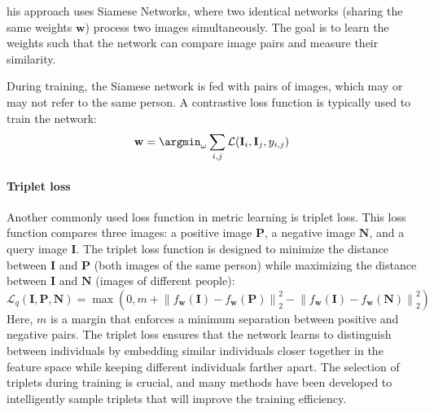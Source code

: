 his approach uses Siamese Networks, where two identical networks (sharing the same weights $\mathbf{w}$) process two images simultaneously. 
The goal is to learn the weights such that the network can compare image pairs and measure their similarity.

During training, the Siamese network is fed with pairs of images, which may or may not refer to the same person. A contrastive loss function is typically used to train the network:
\[\mathbf{w}=\argmin_\omega\sum_{i,j}\mathcal{L}(\mathbf{I}_i,\mathbf{I}_j,y_{i,j})\]

\paragraph*{Triplet loss}
Another commonly used loss function in metric learning is triplet loss. 
This loss function compares three images: a positive image $\mathbf{P}$, a negative image $\mathbf{N}$, and a query image $\mathbf{I}$. 
The triplet loss function is designed to minimize the distance between $\mathbf{I}$ and $\mathbf{P}$ (both images of the same person) while maximizing the distance between $\mathbf{I}$ and $\mathbf{N}$ (images of different people):
\[\mathcal{L}_q(\mathbf{I}, \mathbf{P}, \mathbf{N}) = \max \left( 0, m + {\left\lVert f_\mathbf{w}(\mathbf{I}) - f_\mathbf{w}(\mathbf{P}) \right\rVert}_2^2 - {\left\lVert f_\mathbf{w}(\mathbf{I}) - f_\mathbf{w}(\mathbf{N}) \right\rVert}_2^2 \right)\]
Here, $m$ is a margin that enforces a minimum separation between positive and negative pairs. 
The triplet loss ensures that the network learns to distinguish between individuals by embedding similar individuals closer together in the feature space while keeping different individuals farther apart.
The selection of triplets during training is crucial, and many methods have been developed to intelligently sample triplets that will improve the training efficiency.